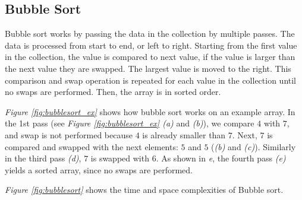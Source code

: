 \subsection{Bubble Sort}

Bubble sort works by passing the data in the collection by multiple passes. The data is processed from start to end, or left to right. Starting from the first value in the collection, the value is compared to next value, if the value is larger than the next value they are swapped. The largest value is moved to the right. This comparison and swap operation is repeated for each value in the collection until no swaps are performed. Then, the array is in sorted order.

\textit{Figure \ref{fig:bubblesort_ex}} shows how bubble sort works on an example array. In the 1st pass (see \textit{Figure \ref{fig:bubblesort_ex} (a)} and \textit{(b)}), we compare $4$ with $7$, and swap is not performed because $4$ is already smaller than $7$. Next, $7$ is compared and swapped with the next elements: $5$ and $5$ (\textit{(b)} and \textit{(c)}). Similarly in the third pass \textit{(d)}, $7$ is swapped with $6$. As shown in \textit{{e}}, the fourth pass \textit{(e)} yields a sorted array, since no swaps are performed. 

\textit{Figure \ref{fig:bubblesort}} shows the time and space complexities of Bubble sort.

